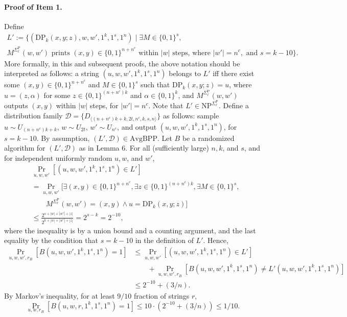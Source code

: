 \documentclass[10pt,a4paper]{article}
\begin{document}
\paragraph{Proof of Item 1.} Define
\begin{multline*}
L':=\{(\mathrm{DP}_k(x,y;z),w,w',1^k,1^s,1^n)\mid\exists M\in\{0,1\}^s,\\
M^{\Sigma_\ell^{\mathrm P}}(w,w')\text{ prints }(x,y)\in\{0,1\}^{n+n^c}\text{ within }|w|\text{ steps, where }|w'|=n^c,\text{ and }s=k-10\}.
\end{multline*}
More formally, in this and subsequent proofs, the above notation should be interpreted as follows: a string $(u,w,w',1^k,1^s,1^n)$ belongs to $L'$ iff there exist some $(x,y)\in\{0,1\}^{n+n^c}$ and $M\in\{0,1\}^s$ such that $\mathrm{DP}_k(x,y;z)=u$, where $u=(z,\alpha)$ for some $z\in\{0,1\}^{(n+n^c)k}$ and $\alpha\in\{0,1\}^k$, and $M^{\Sigma_\ell^{\mathrm P}}(w,w')$ outputs $(x,y)$ within $|w|$ steps, for $|w'|=n^c$.
Note that $L'\in\mathrm{NP}^{\Sigma_\ell^{\mathrm P}}$. Define a distribution family $\mathcal D=\{D_{\langle(n+n^c)k+k,2t,n^c,k,s,n\rangle}\}$ as follows: sample $u\sim U_{(n+n^c)k+k}$, $w\sim U_{2t}$, $w'\sim U_{n^c}$, and output $(u,w,w',1^k,1^s,1^n)$, for $s=k-10$. By assumption, $(L',\mathcal D)\in\mathrm{AvgBPP}$. Let $B$ be a randomized algorithm for $(L',\mathcal D)$ as in Lemma 6.
For all (sufficiently large) $n,k$, and $s$, and for independent uniformly random $u,w$, and $w'$,
\begin{align*}
&\Pr_{u,w,w'}[(u,w,w',1^k,1^s,1^n)\in L']\\
&=\Pr_{u,w,w'}[\exists(x,y)\in\{0,1\}^{n+n^c},\exists z\in\{0,1\}^{(n+n^c)k},\exists M\in\{0,1\}^s,\\
&\qquad M^{\Sigma_\ell^{\mathrm P}}(w,w')=(x,y)\wedge u=\mathrm{DP}_k(x,y;z)]\\
&\leq\frac{2^{s+|w|+|w'|+|z|}}{2^{k+|w|+|w'|+|z|}}=2^{s-k}=2^{-10},
\end{align*}
where the inequality is by a union bound and a counting argument, and the last equality by the condition that $s=k-10$ in the definition of $L'$. Hence,
\begin{align*}
\Pr_{u,w,w',r_B}[B(u,w,w',1^k,1^s,1^n)=1]
&\leq\Pr_{u,w,w'}[(u,w,w',1^k,1^s,1^n)\in L']\\
&\qquad+\Pr_{u,w,w',r_B}[B(u,w,w',1^k,1^s,1^n)\neq L'(u,w,w',1^k,1^s,1^n)]\\
&\leq2^{-10}+(3/n).
\end{align*}
By Markov's inequality, for at least $9/10$ fraction of strings $r$,
\[\Pr_{u,w,r_B}[B(u,w,r,1^k,1^s,1^n)=1]\leq10\cdot(2^{-10}+(3/n))\leq1/10.\tag{18}\]
\end{document}

